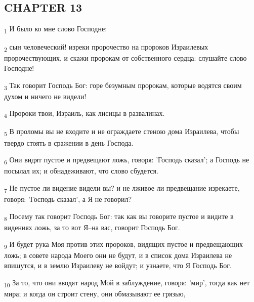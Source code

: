 \subsection{CHAPTER 13}
\begin{tcolorbox}
\textsubscript{1} И было ко мне слово Господне:
\end{tcolorbox}
\begin{tcolorbox}
\textsubscript{2} сын человеческий! изреки пророчество на пророков Израилевых пророчествующих, и скажи пророкам от собственного сердца: слушайте слово Господне!
\end{tcolorbox}
\begin{tcolorbox}
\textsubscript{3} Так говорит Господь Бог: горе безумным пророкам, которые водятся своим духом и ничего не видели!
\end{tcolorbox}
\begin{tcolorbox}
\textsubscript{4} Пророки твои, Израиль, как лисицы в развалинах.
\end{tcolorbox}
\begin{tcolorbox}
\textsubscript{5} В проломы вы не входите и не ограждаете стеною дома Израилева, чтобы твердо стоять в сражении в день Господа.
\end{tcolorbox}
\begin{tcolorbox}
\textsubscript{6} Они видят пустое и предвещают ложь, говоря: 'Господь сказал'; а Господь не посылал их; и обнадеживают, что слово сбудется.
\end{tcolorbox}
\begin{tcolorbox}
\textsubscript{7} Не пустое ли видение видели вы? и не лживое ли предвещание изрекаете, говоря: 'Господь сказал', а Я не говорил?
\end{tcolorbox}
\begin{tcolorbox}
\textsubscript{8} Посему так говорит Господь Бог: так как вы говорите пустое и видите в видениях ложь, за то вот Я--на вас, говорит Господь Бог.
\end{tcolorbox}
\begin{tcolorbox}
\textsubscript{9} И будет рука Моя против этих пророков, видящих пустое и предвещающих ложь; в совете народа Моего они не будут, и в список дома Израилева не впишутся, и в землю Израилеву не войдут; и узнаете, что Я Господь Бог.
\end{tcolorbox}
\begin{tcolorbox}
\textsubscript{10} За то, что они вводят народ Мой в заблуждение, говоря: 'мир', тогда как нет мира; и когда он строит стену, они обмазывают ее грязью,
\end{tcolorbox}
